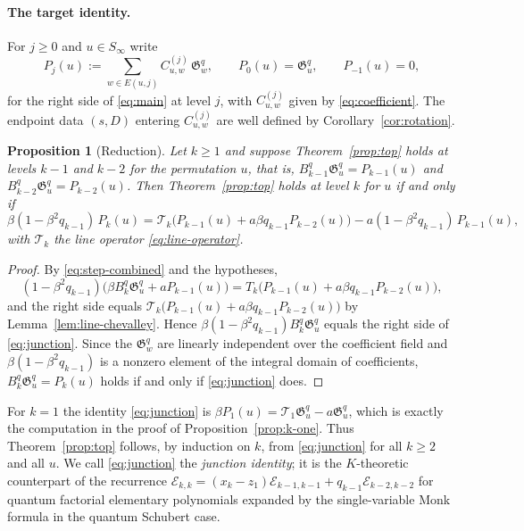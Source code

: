 \documentclass[11pt]{article}
\newtheorem{proposition}{Proposition}
\newcommand{\G}{\mathfrak{G}}
\begin{document}
\paragraph{The target identity.}
For $j\geq0$ and $u\in S_\infty$ write
\[
 P_j(u):=\sum_{w\in E(u,j)}C_{u,w}^{(j)}\,\G_w^q,
 \qquad P_0(u)=\G_u^q,\qquad P_{-1}(u)=0,
\]
for the right side of \eqref{eq:main} at level $j$, with
$C^{(j)}_{u,w}$ given by \eqref{eq:coefficient}. The endpoint
data $(s,D)$ entering $C^{(j)}_{u,w}$ are well defined by
Corollary~\ref{cor:rotation}.

\begin{proposition}[Reduction]\label{prop:reduction}
Let $k\geq1$ and suppose Theorem~\ref{prop:top} holds at levels
$k-1$ and $k-2$ for the permutation $u$, that is,
$B_{k-1}^q\G_u^q=P_{k-1}(u)$ and $B_{k-2}^q\G_u^q=P_{k-2}(u)$.
Then Theorem~\ref{prop:top} holds at level $k$ for $u$ if and only if
\begin{equation}\label{eq:junction}
 \beta(1-\beta^2q_{k-1})\,P_k(u)
 =\mathcal T_k\bigl(P_{k-1}(u)+a\beta q_{k-1}P_{k-2}(u)\bigr)
   -a(1-\beta^2q_{k-1})\,P_{k-1}(u),
\end{equation}
with $\mathcal T_k$ the line operator \eqref{eq:line-operator}.
\end{proposition}

\begin{proof}
By \eqref{eq:step-combined} and the hypotheses,
\[
 (1-\beta^2q_{k-1})\bigl(\beta B_k^q\G_u^q+aP_{k-1}(u)\bigr)
 =T_k\bigl(P_{k-1}(u)+a\beta q_{k-1}P_{k-2}(u)\bigr),
\]
and the right side equals
$\mathcal T_k\bigl(P_{k-1}(u)+a\beta q_{k-1}P_{k-2}(u)\bigr)$ by
Lemma~\ref{lem:line-chevalley}. Hence
$\beta(1-\beta^2q_{k-1})B_k^q\G_u^q$ equals the right side of
\eqref{eq:junction}. Since the $\G_w^q$ are linearly independent over
the coefficient field and $\beta(1-\beta^2q_{k-1})$ is a nonzero
element of the integral domain of coefficients,
$B_k^q\G_u^q=P_k(u)$ holds if and only if \eqref{eq:junction} does.
\end{proof}

For $k=1$ the identity \eqref{eq:junction} is
$\beta P_1(u)=\mathcal T_1\G_u^q-a\G_u^q$, which is exactly the
computation in the proof of Proposition~\ref{prop:k-one}. Thus
Theorem~\ref{prop:top} follows, by induction on $k$, from
\eqref{eq:junction} for all $k\geq2$ and all $u$. We call
\eqref{eq:junction} the \emph{junction identity}; it is the
$K$-theoretic counterpart of the recurrence
$\mathcal E_{k,k}=(x_k-z_1)\mathcal E_{k-1,k-1}+q_{k-1}\mathcal E_{k-2,k-2}$ for quantum factorial elementary polynomials
expanded by the single-variable Monk formula in the quantum Schubert
case.
\end{document}

